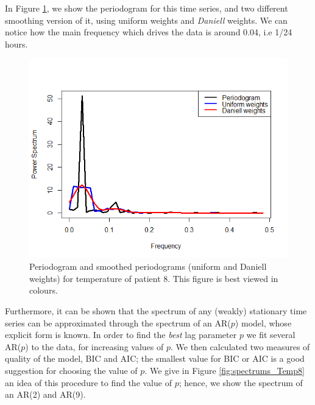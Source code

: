 \documentclass[]{article}
\begin{document}
In Figure \ref{fig:period_Temp8}, we show the periodogram for this time series, and two different smoothing version of it, using uniform weights and \textit{Daniell} weights. We can notice how the main frequency which drives the data is around 0.04, i.e 1/24 hours.

\begin{figure}[htbp]\centering
	\includegraphics[scale = 0.4]{Temp8_Periodograms.png}
	\caption{Periodogram and smoothed periodograms (uniform and Daniell weights) for temperature of patient 8. This figure is best viewed in colours.}
	\label{fig:period_Temp8}
\end{figure}

\vspace{0.1cm}
Furthermore, it can be shown that the spectrum of any (weakly) stationary time series can be approximated through the spectrum of an AR($p$) model, whose explicit form is known. In order to find the \textit{best} lag parameter $p$ we fit several AR($p$) to the data, for increasing values of $p$. We then calculated two measures of quality of the model, BIC and AIC; the smallest value for BIC or AIC is a good suggestion for choosing the value of $p$. We give in Figure \ref{fig:spectrums_Temp8} an idea of this procedure to find the value of $p$; hence, we show the spectrum of an AR(2) and AR(9). 
\end{document}
